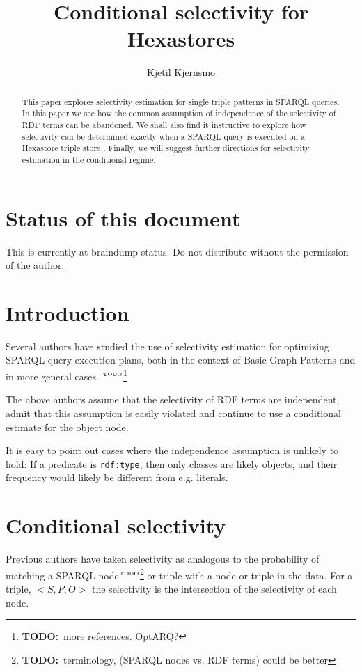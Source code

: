 \documentclass[12pt, draft]{article}
\title{Conditional selectivity for Hexastores}
\author{Kjetil Kjernsmo}
\newcommand{\rdfnode}[1]{\texttt{#1}}
\newcommand{\todo}[1]{\ensuremath{^{\textrm{\tiny{TODO}\normalsize}}}\footnote{\textbf{TODO:}~#1}}
\begin{document}
\maketitle

\section*{Status of this document}

This is currently at braindump status. Do not distribute without the
permission of the author.

\begin{abstract}
This paper explores selectivity estimation for single triple patterns
in SPARQL queries.
In this paper we see how the common assumption of independence of the
selectivity of RDF terms can be abandoned. We shall also find it
instructive to explore how selectivity can be determined exactly when
a SPARQL query is executed on a Hexastore triple store
\cite{Weiss:2008:HSI:1453856.1453965}. Finally, we will suggest
further directions for selectivity estimation in the conditional
regime.

\end{abstract}

\section{Introduction}

Several authors have studied the use of selectivity estimation for
optimizing SPARQL query execution plans, both in the context of Basic
Graph Patterns \cite{Stocker:2008:SBG:1367497.1367578} and in more
general cases. \todo{more references. OptARQ?}

The above authors assume that the selectivity of RDF terms are
independent, admit that this assumption is easily violated and
continue to use a conditional estimate for the object node.

It is easy to point out cases where the independence assumption is
unlikely to hold: If a predicate is \rdfnode{rdf:type}, then only
classes are likely objects, and their frequency  would likely be
different from e.g. literals.

\section{Conditional selectivity}

Previous authors have taken selectivity as analogous to the
probability of matching a SPARQL node\todo{terminology, (SPARQL nodes
  vs. RDF terms) could be better} or triple with a node or triple
in the data. For a triple, $<S, P, O>$ the selectivity is the
intersection of the selectivity of each node.
\end{document}
